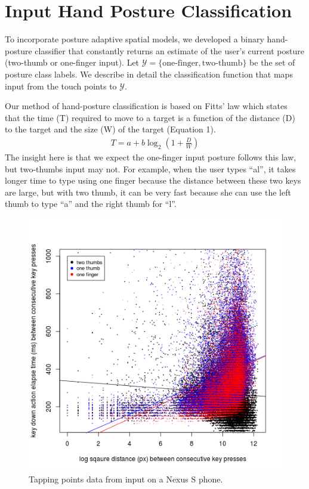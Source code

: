 \documentclass{sigchi}
\begin{document}
\section{Input Hand Posture Classification}\label{sec:posture-classification}
To incorporate posture adaptive spatial models, we developed a binary hand-posture classifier 
that constantly returns an estimate of the user's current posture (two-thumb or one-finger input).
Let $\mathcal{Y} = \{\text{one-finger}, \text{two-thumb}\}$ be the set of posture
class labels. We describe in detail the classification function that maps input from the
touch points to $\mathcal{Y}$.

Our method of hand-posture classification is based on Fitts’ law which states that the time (T) required to move to a target is a function of the distance (D) to the target and the size (W) of the target (Equation 1).
\begin{align}
T = a + b\log_2(1 + \frac{D}{W})
\end{align}                                                  
The insight here is that we expect the one-finger input posture follows this law,  but two-thumbs input may not. For example, when the user types “al”, it takes longer time to type using one finger because the distance between these two keys are large, but with two thumb, it can be very fast because she can use the left thumb to type “a” and the right thumb for “l”.

\begin{figure}[tb]
  \centering
  \includegraphics[width=0.9\columnwidth]{figures/time-distance.png}
  \caption{Tapping points data from input on a Nexus S phone.}
  \label{fig:time-distance}
\end{figure}
\end{document}

